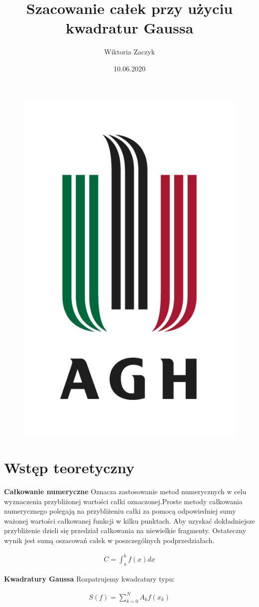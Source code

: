 \documentclass{article}
\begin{document}
\title{Szacowanie całek przy użyciu kwadratur Gaussa}
\author{Wiktoria Zaczyk}
\date{10.06.2020}

\maketitle

\begin{figure}[H]
\begin{center}
\includegraphics[height=0.3\linewidth]{agh.jpg}
\label{pierwszy} 
\end{center}
\end{figure}

\section{Wstęp teoretyczny}
\textbf{Całkowanie numeryczne}
\newline
Oznacza zastosowanie metod numerycznych w celu wyznaczenia przybliżonej wartości całki oznaczonej.Proste metody całkowania numerycznego polegają na przybliżeniu całki za pomocą odpowiedniej sumy ważonej wartości całkowanej funkcji w kilku punktach. Aby uzyskać dokładniejsze przybliżenie dzieli się przedział całkowania na niewielkie fragmenty. Ostateczny wynik jest sumą oszacowań całek w poszczególnych podprzedziałach.

\begin{equation}
\begin{array}{c}
C = \displaystyle \int_{a}^{b} f(x)dx 
\end{array}
\end{equation}

\newline
\setlength{\parindent}{0pt}
\textbf{Kwadratury Gaussa}
\newline
Rozpatrujemy kwadratury typu: 

\begin{equation}
\begin{array}{c}
S(f)=\displaystyle \sum^N_{k=0} A_k f(x_k)
\end{array}
\end{equation}
\end{document}
